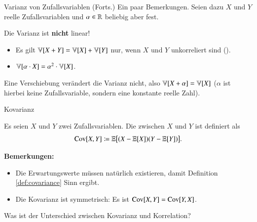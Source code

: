 \begin{frame}{Varianz von Zufallsvariablen (Forts.)}{}
	Ein paar Bemerkungen. Seien dazu $X$ und $Y$ reelle Zufallsvariablen und $\alpha \in \mathbb{R}$ beliebig aber fest.
	
	\begin{boxGray}
		Die Varianz ist \textbf{nicht} linear!
		\begin{itemize}
			\item Es gilt $\mathbb{V}[X + Y] = \mathbb{V}[X] + \mathbb{V}[Y]$ nur, wenn $X$ und $Y$ unkorreliert sind ().
			\item $\mathbb{V}[\alpha \cdot X] = \alpha^2 \cdot \mathbb{V}[X]$.
		\end{itemize}
	\end{boxGray}

	\begin{boxGray}
		Eine Verschiebung verändert die Varianz nicht, also $\mathbb{V}[X + \alpha] = \mathbb{V}[X]$ ($\alpha$ ist hierbei keine Zufallsvariable,
		sondern eine konstante reelle Zahl).
	\end{boxGray}
\end{frame}


\begin{frame}{Kovarianz}{}
	\begin{mydef}
		Es seien $X$ und $Y$ zwei Zufallsvariablen. Die  zwischen $X$ und $Y$ ist definiert als
		\begin{equation*}
			\text{Cov}[X, Y] \coloneqq \mathbb{E}\bigl[ (X - \mathbb{E}[X]) (Y - \mathbb{E}[Y]) \bigr].
		\end{equation*}
	\end{mydef}

	\begin{boxGray}
		\textbf{Bemerkungen:}
		\begin{itemize}
			\item Die Erwartungswerte müssen natürlich existieren, damit Definition \ref{def:covariance} Sinn ergibt.
			\item Die Kovarianz ist symmetrisch: Es ist $\text{Cov}[X, Y] = \text{Cov}[Y, X]$.
		\end{itemize}
	\end{boxGray}
	
	\begin{mytask}
		Was ist der Unterschied zwischen Kovarianz und Korrelation?
	\end{mytask}
\end{frame}


